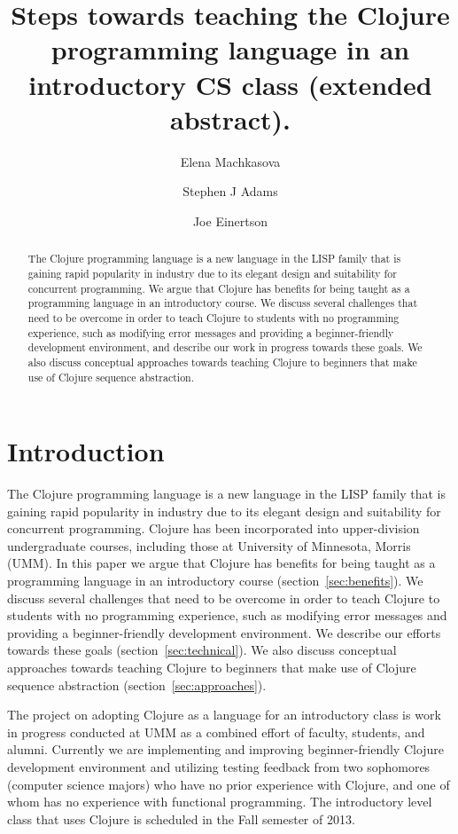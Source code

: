 \documentclass[submission,copyright,creativecommons]{eptcs}
\title{Steps towards teaching the Clojure programming language in an introductory CS  class (extended abstract).}
\author{Elena Machkasova 
\institute{University of Minnesota, Morris
\email{elenam@morris.umn.edu}}
\and
Stephen J Adams 
\institute{\email{adams601@morris.umn.edu}}
\and 
Joe Einertson 
\institute{University of Minnesota, Morris
\email{eine0017@morris.umn.edu}}
}
\newcommand{\allcomments}[1]{{#1}}
\newcommand{\joecomment}[1]{{\bf \color{JoesGold}{\allcomments{{#1}}}}}
\begin{document}
\maketitle

\begin{abstract}
The Clojure programming language is a new language in the LISP family that is gaining rapid popularity in industry due to its elegant design and suitability for concurrent programming. We argue that Clojure has benefits for being taught as a programming language in an introductory course. We discuss several challenges that need to be overcome in order to teach Clojure to students with no programming experience, such as modifying error messages and providing a beginner-friendly development environment, and describe our work in progress towards these goals. We also discuss conceptual approaches towards teaching Clojure to beginners that make use of Clojure sequence abstraction. 
\end{abstract}

\section{Introduction}
The Clojure programming language is a new language in the LISP family that is gaining rapid popularity in industry due to its elegant design and suitability for concurrent programming. Clojure has been incorporated into upper-division undergraduate courses, including those at University of Minnesota, Morris (UMM). In this paper we argue that Clojure has benefits for being taught as a programming language in an introductory course (section~\ref{sec:benefits}). We discuss several challenges that need to be overcome in order to teach Clojure to students with no programming experience, such as modifying error messages and providing a beginner-friendly development environment. We describe our efforts towards these goals (section~\ref{sec:technical}). We also discuss conceptual approaches towards teaching Clojure to beginners that make use of Clojure sequence abstraction (section~\ref{sec:approaches}). 

The project on adopting Clojure as a language for an introductory class is work in progress conducted at UMM as a combined effort of faculty, students, and alumni. Currently we are implementing and improving beginner-friendly Clojure development environment and utilizing testing feedback from two sophomores (computer science majors) who have no prior experience with Clojure, and one of whom has no experience with functional programming. The introductory level class that uses Clojure is scheduled  in the Fall semester of 2013. 
\end{document}
